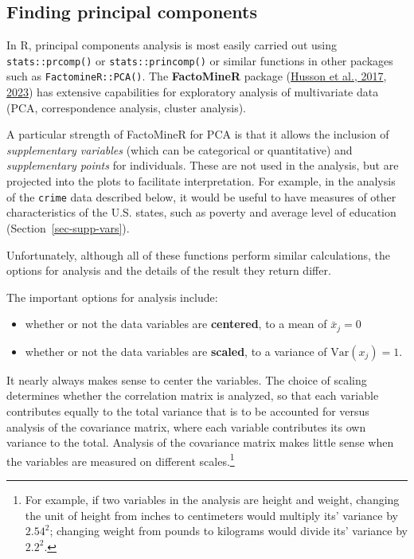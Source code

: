 \documentclass[
  letterpaper,
  10pt,
  krantz2]{krantz}
\providecommand{\tightlist}{%
  \setlength{\itemsep}{0pt}\setlength{\parskip}{0pt}}\usepackage{longtable,booktabs,array}
\begin{document}
\hypertarget{finding-principal-components}{%
\subsection{Finding principal
components}\label{finding-principal-components}}

In R, principal components analysis is most easily carried out using
\texttt{stats::prcomp()} or \texttt{stats::princomp()} or similar
functions in other packages such as \texttt{FactomineR::PCA()}. The
\textbf{FactoMineR} package
(\protect\hyperlink{ref-Husson-etal-2017}{Husson et al., 2017},
\protect\hyperlink{ref-R-FactoMineR}{2023}) has extensive capabilities
for exploratory analysis of multivariate data (PCA, correspondence
analysis, cluster analysis).

A particular strength of FactoMineR for PCA is that it allows the
inclusion of \emph{supplementary variables} (which can be categorical or
quantitative) and \emph{supplementary points} for individuals. These are
not used in the analysis, but are projected into the plots to facilitate
interpretation. For example, in the analysis of the \texttt{crime} data
described below, it would be useful to have measures of other
characteristics of the U.S. states, such as poverty and average level of
education (Section~\ref{sec-supp-vars}).

Unfortunately, although all of these functions perform similar
calculations, the options for analysis and the details of the result
they return differ.

The important options for analysis include:

\begin{itemize}
\tightlist
\item
  whether or not the data variables are \textbf{centered}, to a mean of
  \(\bar{x}_j =0\)
\item
  whether or not the data variables are \textbf{scaled}, to a variance
  of \(\text{Var}(x_j) =1\).
\end{itemize}

It nearly always makes sense to center the variables. The choice of
scaling determines whether the correlation matrix is analyzed, so that
each variable contributes equally to the total variance that is to be
accounted for versus analysis of the covariance matrix, where each
variable contributes its own variance to the total. Analysis of the
covariance matrix makes little sense when the variables are measured on
different scales.\footnote{For example, if two variables in the analysis
  are height and weight, changing the unit of height from inches to
  centimeters would multiply its' variance by \(2.54^2\); changing
  weight from pounds to kilograms would divide its' variance by
  \(2.2^2\).}
\end{document}
